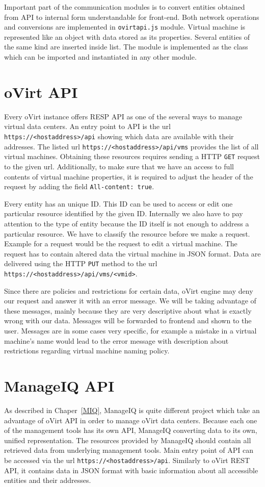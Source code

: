 Important part of the communication modules is to convert entities obtained from API to internal form understandable for front-end. Both network operations and conversions are implemented in \texttt{ovirtapi.js} module. Virtual machine is represented like an object with data stored as its properties. Several entities of the same kind are inserted inside list. The module is implemented as the class which can be imported and instantiated in any other module.

\section{oVirt API}
Every oVirt instance offers RESP API as one of the several ways to manage virtual data centers. An entry point to API is the url \texttt{https://<hostaddress>/api} showing which data are available with their addresses. The listed url \texttt{https://<hostaddress>/api/vms} provides the list of all virtual machines. Obtaining these resources requires sending a HTTP \texttt{GET} request to the given url. Additionally, to make sure that we have an access to full contents of virtual machine properties, it is required to adjust the header of the request by adding the field \texttt{All-content: true}.

Every entity has an unique ID. This ID can be used to access or edit one particular resource identified by the given ID. Internally we also have to pay attention to the type of entity because the ID itself is not enough to address a particular resource. We have to classify the resource before we make a request. Example for a request would be the request to edit a virtual machine. The request has to contain altered data the virtual machine in JSON format. Data are delivered using the HTTP \texttt{PUT} method to the url \texttt{https://<hostaddress>/api/vms/<vmid>}.

Since there are policies and restrictions for certain data, oVirt engine may deny our request and answer it with an error message. We will be taking advantage of these messages, mainly because they are very descriptive about what is exactly wrong with our data. Messages will be forwarded to frontend and shown to the user. Messages are in some cases very specific, for example a mistake in a virtual machine's name would lead to the error message with description about restrictions regarding virtual machine naming policy. 

\section{ManageIQ API}\label{miq}
As described in Chaper~\ref{MIQ}, ManageIQ is quite different project which take an advantage of oVirt API in order to manage oVirt data centers. Because each one of the management tools has its own API, ManageIQ converting data to its own, unified representation. The resources provided by ManageIQ should contain all retrieved data from underlying management tools.
Main entry point of API can be accessed via the url \texttt{https://<hostaddress>/api}. Similarly to oVirt REST API, it contains data in JSON format with basic information about all accessible entities and their addresses. 

